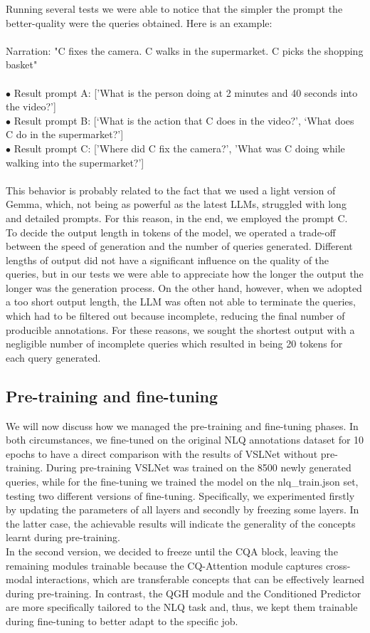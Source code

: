 \documentclass[10pt,twocolumn,letterpaper]{article}
\begin{document}
Running several tests we were able to notice that the simpler the prompt the better-quality were the queries obtained. Here is an example: \\ \\
Narration:  "C fixes the camera.  C walks in the supermarket.  C picks the shopping basket"\\\\
$\bullet$ Result prompt A: ['What is the person doing at 2 minutes and 40 seconds into the video?'] \\
$\bullet$ Result prompt B: [‘What is the action that C does in the video?’, ‘What does C do in the supermarket?’] \\
$\bullet$ Result prompt C: ['Where did C fix the camera?', 'What was C doing while walking into the supermarket?'] \\\\
This behavior is probably related to the fact that we used a light version of Gemma, which, not being as powerful as the latest LLMs, struggled with long and detailed prompts. For this reason, in the end, we employed the prompt C.\\
To decide the output length in tokens of the model, we operated a trade-off between the speed of generation and the number of queries generated.  Different lengths of output did not have a significant influence on the quality of the queries, but in our tests we were able to appreciate how the longer the output the longer was the generation process. On the other hand, however, when we adopted a too short output length, the LLM was often not able to terminate the queries, which had to be filtered out because incomplete, reducing the final number of producible annotations. For these reasons, we sought the shortest output with a negligible number of incomplete queries which resulted in being 20 tokens for each query generated.

\subsection{Pre-training and fine-tuning}
We will now discuss how we managed the pre-training and fine-tuning phases. In both circumstances, we fine-tuned on the original NLQ annotations dataset for 10 epochs to have a direct comparison with the results of VSLNet without pre-training. During pre-training VSLNet was trained on the 8500 newly generated queries, while for the fine-tuning we trained the model on the nlq\_train.json set, testing two different versions of fine-tuning. Specifically, we experimented firstly by updating the parameters of all layers and secondly by freezing some layers. In the latter case, the achievable results will indicate the generality of the concepts learnt during pre-training.\\
In the second version, we decided to freeze until the CQA block, leaving the remaining modules trainable because the CQ-Attention module captures cross-modal interactions, which are transferable concepts that can be effectively learned during pre-training. In contrast, the QGH module and the Conditioned Predictor are more specifically tailored to the NLQ task and, thus, we kept them trainable during fine-tuning to better adapt to the specific job.
\end{document}
